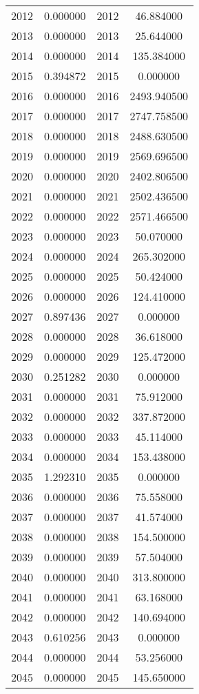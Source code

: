 \documentclass[12pt]{article}
\begin{document}
\begin{longtable}{@{}cccc@{}}
2012 & 0.000000 & 2012 & 46.884000 \\
2013 & 0.000000 & 2013 & 25.644000 \\
2014 & 0.000000 & 2014 & 135.384000 \\
2015 & 0.394872 & 2015 & 0.000000 \\
2016 & 0.000000 & 2016 & 2493.940500 \\
2017 & 0.000000 & 2017 & 2747.758500 \\
2018 & 0.000000 & 2018 & 2488.630500 \\
2019 & 0.000000 & 2019 & 2569.696500 \\
2020 & 0.000000 & 2020 & 2402.806500 \\
2021 & 0.000000 & 2021 & 2502.436500 \\
2022 & 0.000000 & 2022 & 2571.466500 \\
2023 & 0.000000 & 2023 & 50.070000 \\
2024 & 0.000000 & 2024 & 265.302000 \\
2025 & 0.000000 & 2025 & 50.424000 \\
2026 & 0.000000 & 2026 & 124.410000 \\
2027 & 0.897436 & 2027 & 0.000000 \\
2028 & 0.000000 & 2028 & 36.618000 \\
2029 & 0.000000 & 2029 & 125.472000 \\
2030 & 0.251282 & 2030 & 0.000000 \\
2031 & 0.000000 & 2031 & 75.912000 \\
2032 & 0.000000 & 2032 & 337.872000 \\
2033 & 0.000000 & 2033 & 45.114000 \\
2034 & 0.000000 & 2034 & 153.438000 \\
2035 & 1.292310 & 2035 & 0.000000 \\
2036 & 0.000000 & 2036 & 75.558000 \\
2037 & 0.000000 & 2037 & 41.574000 \\
2038 & 0.000000 & 2038 & 154.500000 \\
2039 & 0.000000 & 2039 & 57.504000 \\
2040 & 0.000000 & 2040 & 313.800000 \\
2041 & 0.000000 & 2041 & 63.168000 \\
2042 & 0.000000 & 2042 & 140.694000 \\
2043 & 0.610256 & 2043 & 0.000000 \\
2044 & 0.000000 & 2044 & 53.256000 \\
2045 & 0.000000 & 2045 & 145.650000 \\

\end{longtable}
\end{document}
